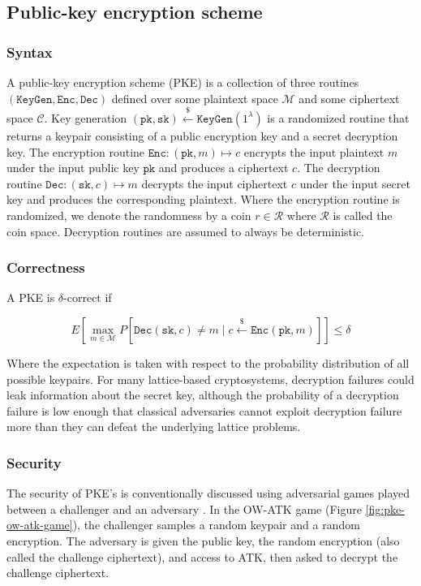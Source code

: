 \documentclass[runningheads]{llncs}
\newcommand{\keygen}{\texttt{KeyGen}}
\newcommand{\encrypt}{\texttt{Enc}}
\newcommand{\decrypt}{\texttt{Dec}}
\newcommand{\pk}{\texttt{pk}}
\newcommand{\sk}{\texttt{sk}}
\newcommand{\leftsample}{\stackrel{\$}{\leftarrow}}
\begin{document}
\subsection{Public-key encryption scheme}
\subsubsection{Syntax} A public-key encryption scheme (PKE) is a collection of three routines $(\keygen, \encrypt, \decrypt)$ defined over some plaintext space $\mathcal{M}$ and some ciphertext space $\mathcal{C}$. Key generation $(\pk, \sk) \leftsample \keygen(1^\lambda)$ is a randomized routine that returns a keypair consisting of a public encryption key and a secret decryption key. The encryption routine $\encrypt: (\pk, m) \mapsto c$ encrypts the input plaintext $m$ under the input public key $\pk$ and produces a ciphertext $c$. The decryption routine $\decrypt: (\sk, c) \mapsto m$ decrypts the input ciphertext $c$ under the input secret key and produces the corresponding plaintext. Where the encryption routine is randomized, we denote the randomness by a coin $r \in \mathcal{R}$ where $\mathcal{R}$ is called the coin space. Decryption routines are assumed to always be deterministic.

\subsubsection{Correctness} A PKE is $\delta$-correct if

\begin{equation*}
    E\left[\max_{m\in\mathcal{M}}
        P\left[ \decrypt(\sk, c) \neq m \mid c \leftsample \encrypt(\pk, m)\right]
    \right] \leq \delta
\end{equation*}

Where the expectation is taken with respect to the probability distribution of all possible keypairs. For many lattice-based cryptosystems, decryption failures could leak information about the secret key, although the probability of a decryption failure is low enough that classical adversaries cannot exploit decryption failure more than they can defeat the underlying lattice problems.

\subsubsection{Security} The security of PKE's is conventionally discussed using adversarial games played between a challenger and an adversary \cite{DBLP:conf/stoc/GoldwasserM82}. In the OW-ATK game (Figure \ref{fig:pke-ow-atk-game}), the challenger samples a random keypair and a random encryption. The adversary is given the public key, the random encryption (also called the challenge ciphertext), and access to ATK, then asked to decrypt the challenge ciphertext.
\end{document}
